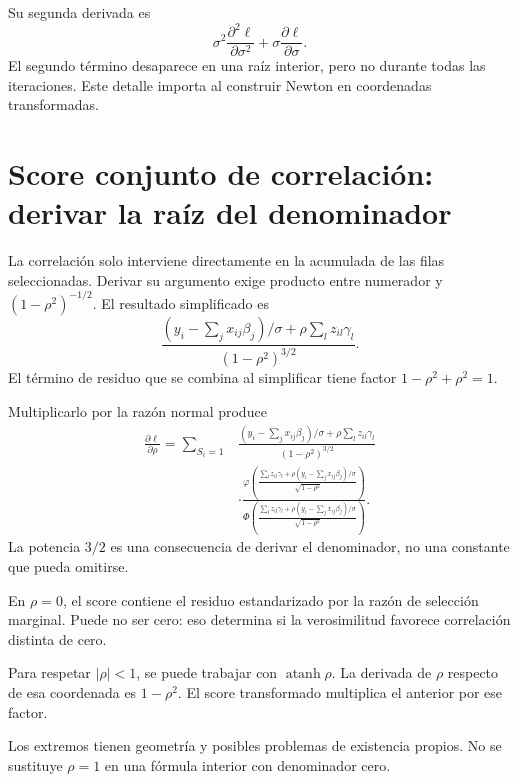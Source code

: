 \documentclass[11pt,a4paper]{article}
\begin{document}
Su segunda derivada es
\[
\sigma^2\frac{\partial^2\ell}{\partial\sigma^2}
+\sigma\frac{\partial\ell}{\partial\sigma}.
\]
El segundo término desaparece
en una raíz interior,
pero no durante todas
las iteraciones.
Este detalle importa
al construir Newton
en coordenadas transformadas.

\clearpage
\section{Score conjunto de correlación: derivar la raíz del denominador}\label{unidad146}
La correlación solo interviene
directamente en la acumulada
de las filas seleccionadas.
Derivar su argumento exige
producto entre numerador y
\((1-\rho^2)^{-1/2}\).
El resultado simplificado es
\[
\frac{
(y_i-\sum_jx_{ij}\beta_j)/\sigma+
\rho\sum_lz_{il}\gamma_l
}{(1-\rho^2)^{3/2}}.
\]
El término de residuo
que se combina al simplificar
tiene factor \(1-\rho^2+\rho^2=1\).

Multiplicarlo por la
razón normal produce
\[
\begin{aligned}
\frac{\partial\ell}{\partial\rho}
=\sum_{S_i=1}
&\frac{
(y_i-\sum_jx_{ij}\beta_j)/\sigma+
\rho\sum_lz_{il}\gamma_l
}{(1-\rho^2)^{3/2}}\\
&\cdot
\frac{
\varphi\left(\frac{\sum_lz_{il}\gamma_l+
\rho(y_i-\sum_jx_{ij}\beta_j)/\sigma}{\sqrt{1-\rho^2}}\right)}
{\Phi\left(\frac{\sum_lz_{il}\gamma_l+
\rho(y_i-\sum_jx_{ij}\beta_j)/\sigma}{\sqrt{1-\rho^2}}\right)}.
\end{aligned}
\]
La potencia \(3/2\)
es una consecuencia
de derivar el denominador,
no una constante que
pueda omitirse.

\begin{ejemplo}
En \(\rho=0\), el
score contiene el residuo
estandarizado por la
razón de selección marginal.
Puede no ser cero:
eso determina si
la verosimilitud favorece
correlación distinta de cero.
\end{ejemplo}
Para respetar \(|\rho|<1\),
se puede trabajar con
\(\operatorname{atanh}\rho\).
La derivada de \(\rho\)
respecto de esa coordenada
es \(1-\rho^2\).
El score transformado
multiplica el anterior
por ese factor.

Los extremos tienen geometría
y posibles problemas de
existencia propios.
No se sustituye \(\rho=1\)
en una fórmula interior
con denominador cero.

\clearpage
\end{document}
